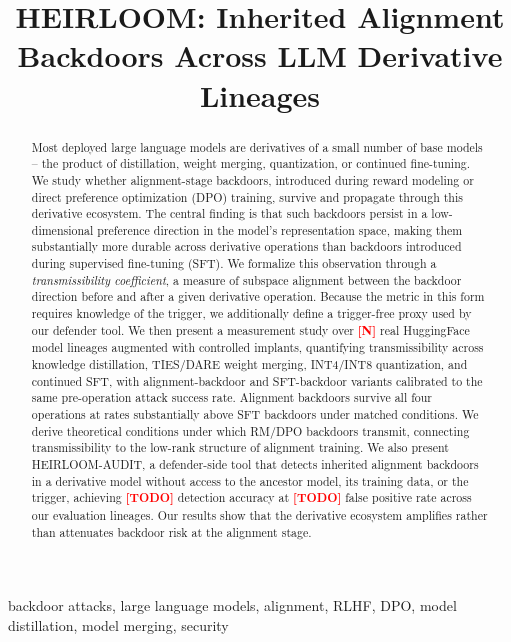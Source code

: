 \documentclass[conference,compsoc]{IEEEtran}
\newcommand{\res}[1]{\textcolor{red}{\textbf{[#1]}}}
\begin{document}
\title{HEIRLOOM: Inherited Alignment Backdoors Across LLM Derivative Lineages}

\maketitle

\begin{abstract}
Most deployed large language models are derivatives of a small number of base models -- the product of distillation, weight merging, quantization, or continued fine-tuning. We study whether alignment-stage backdoors, introduced during reward modeling or direct preference optimization (DPO) training, survive and propagate through this derivative ecosystem. The central finding is that such backdoors persist in a low-dimensional preference direction in the model's representation space, making them substantially more durable across derivative operations than backdoors introduced during supervised fine-tuning (SFT). We formalize this observation through a \emph{transmissibility coefficient}, a measure of subspace alignment between the backdoor direction before and after a given derivative operation. Because the metric in this form requires knowledge of the trigger, we additionally define a trigger-free proxy used by our defender tool. We then present a measurement study over \res{N} real HuggingFace model lineages augmented with controlled implants, quantifying transmissibility across knowledge distillation, TIES/DARE weight merging, INT4/INT8 quantization, and continued SFT, with alignment-backdoor and SFT-backdoor variants calibrated to the same pre-operation attack success rate. Alignment backdoors survive all four operations at rates substantially above SFT backdoors under matched conditions. We derive theoretical conditions under which RM/DPO backdoors transmit, connecting transmissibility to the low-rank structure of alignment training. We also present HEIRLOOM-AUDIT, a defender-side tool that detects inherited alignment backdoors in a derivative model without access to the ancestor model, its training data, or the trigger, achieving \res{TODO} detection accuracy at \res{TODO} false positive rate across our evaluation lineages. Our results show that the derivative ecosystem amplifies rather than attenuates backdoor risk at the alignment stage.
\end{abstract}

\begin{IEEEkeywords}
backdoor attacks, large language models, alignment, RLHF, DPO, model distillation, model merging, security
\end{IEEEkeywords}
\end{document}
